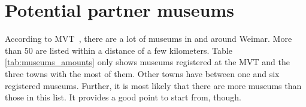 %


\section{Potential partner museums}
\label{partnering_investigation}

According to \ac{MVT}~\cite{ThueringerMuseumsverbandOrte}, there are a lot of museums in and around Weimar. More than 50 are listed within a distance of a few kilometers. Table \ref{tab:museums_amounts} only shows museums registered at the \ac{MVT} and the three towns with the most of them. Other towns have between one and six registered museums. Further, it is most likely that there are more museums than those in this list. It provides a good point to start from, though.

